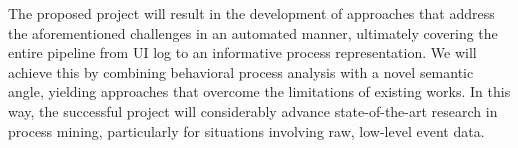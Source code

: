 
%

 The proposed project will result in the development of approaches that address the aforementioned challenges in an automated manner, ultimately covering the entire pipeline from UI log to an informative process representation. We will achieve this by combining behavioral process analysis with a novel semantic angle, yielding approaches that overcome the limitations of existing works. In this way, the successful project will considerably advance state-of-the-art research in process mining, particularly for situations involving raw, low-level event data.


